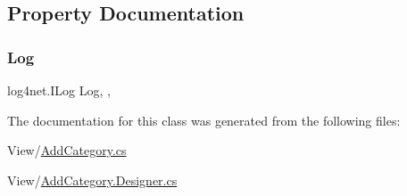 \subsection{Property Documentation}
\mbox{\label{classWildlifeTrackingApp_1_1AddCategory_a5fc9abb86e6110ecd61d0a1a7d740a8a}} 
\subsubsection{\texorpdfstring{Log}{Log}}
{\footnotesize\ttfamily log4net.\+I\+Log Log\hspace{0.3cm}{\ttfamily [static]}, {\ttfamily [get]}, {}}



The documentation for this class was generated from the following files\+:\begin{DoxyCompactItemize}
\item 
View/\hyperlink{AddCategory_8cs}{Add\+Category.\+cs}\item 
View/\hyperlink{AddCategory_8Designer_8cs}{Add\+Category.\+Designer.\+cs}\end{DoxyCompactItemize}

